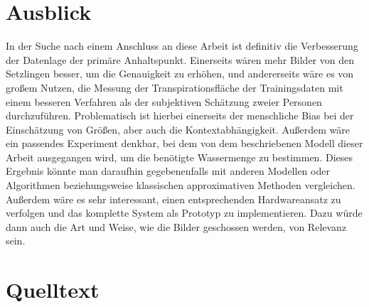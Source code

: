 \section{Ausblick}
In der Suche nach einem Anschluss an diese Arbeit ist definitiv die Verbesserung der Datenlage der primäre Anhaltspunkt. Einerseits wären mehr Bilder von den Setzlingen besser, um die Genauigkeit zu erhöhen, und andererseits wäre es von großem Nutzen, die Messung der Transpirationsfläche der Trainingsdaten mit einem besseren Verfahren als der subjektiven Schätzung zweier Personen durchzuführen. Problematisch ist hierbei einerseits der menschliche Bias bei der Einschätzung von Größen, aber auch die Kontextabhängigkeit. Außerdem wäre ein passendes Experiment denkbar, bei dem von dem beschriebenen Modell dieser Arbeit ausgegangen wird, um die benötigte Wassermenge zu bestimmen. Dieses Ergebnis könnte man daraufhin gegebenenfalls mit anderen Modellen oder Algorithmen beziehungsweise klassischen approximativen Methoden vergleichen. Außerdem wäre es sehr interessant, einen entsprechenden Hardwareansatz zu verfolgen und das komplette System als Prototyp zu implementieren. Dazu würde dann auch die Art und Weise, wie die Bilder geschossen werden, von Relevanz sein.
\newpage
\section{Quelltext}
